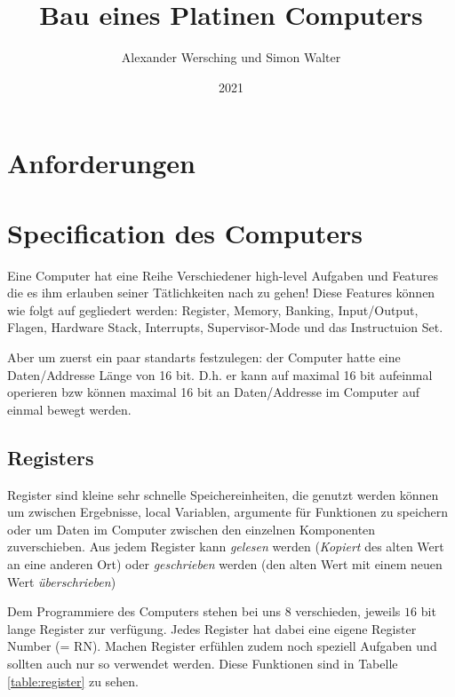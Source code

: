 \documentclass{scrartcl}
\begin{document}
\title{Bau eines Platinen Computers}
\author{Alexander Wersching und Simon Walter}
\date{2021}
\maketitle
\newpage


\tableofcontents
\newpage

\section{Anforderungen}

\section{Specification des Computers}
Eine Computer hat eine Reihe Verschiedener high-level Aufgaben und Features die es ihm erlauben seiner Tätlichkeiten nach zu gehen! 
Diese Features können wie folgt auf gegliedert werden: Register, Memory, Banking, Input/Output, Flagen, Hardware Stack, Interrupts, Supervisor-Mode und das Instructuion Set.

Aber um zuerst ein paar standarts festzulegen: der Computer hatte eine Daten/Addresse Länge von 16 bit. D.h. er kann auf 
maximal 16 bit aufeinmal operieren bzw können maximal 16 bit an Daten/Addresse im Computer auf einmal bewegt werden.

\subsection{Registers}
Register sind kleine sehr schnelle Speichereinheiten, die genutzt werden können um zwischen Ergebnisse, local Variablen, argumente für Funktionen zu speichern oder um Daten im Computer zwischen den einzelnen Komponenten zuverschieben. Aus jedem Register kann \emph{gelesen} werden (\emph{Kopiert} des alten Wert an eine anderen Ort) oder \emph{geschrieben} werden (den alten Wert mit einem neuen Wert \emph{überschrieben})

Dem Programmiere des Computers stehen bei uns $8$ verschieden, jeweils $16$ bit lange Register zur verfügung. Jedes Register hat dabei eine eigene Register Number (= RN). Machen Register erfühlen zudem noch speziell Aufgaben und sollten auch nur so verwendet werden. Diese Funktionen sind in Tabelle \ref{table:register} zu sehen.
\end{document}

